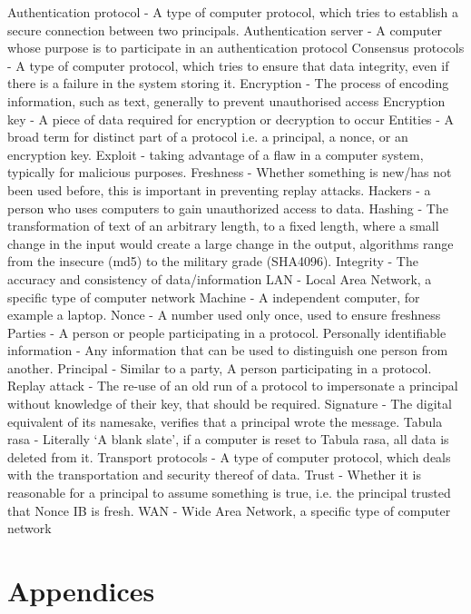 \documentclass{article}
\begin{document}
Authentication protocol - A type of computer protocol, which tries to establish a secure connection between two principals.
Authentication server - A computer whose purpose is to participate in an authentication protocol
Consensus protocols - A type of computer protocol, which tries to ensure that data integrity, even if there is a failure in the system storing it.
Encryption - The process of encoding information, such as text, generally to prevent unauthorised access
Encryption key - A piece of data required for encryption or decryption to occur
Entities - A broad term for distinct part of a protocol i.e. a principal, a nonce, or an encryption key.
Exploit - taking advantage of a flaw in a computer system, typically for malicious purposes.
Freshness - Whether something is new/has not been used before, this is important in preventing replay attacks.
Hackers - a person who uses computers to gain unauthorized access to data.
Hashing - The transformation of text of an arbitrary length, to a fixed length, where a small change in the input would create a large change in the output, algorithms range from the insecure (md5) to the military grade (SHA4096).
Integrity - The accuracy and consistency of data/information
LAN - Local Area Network, a specific type of computer network
Machine - A independent computer, for example a laptop.
Nonce - A number used only once, used to ensure freshness
Parties - A person or people participating in a protocol.
Personally identifiable information - Any information that can be used to distinguish one person from another.
Principal - Similar to a party, A person participating in a protocol.
Replay attack - The re-use of an old run of a protocol to impersonate a principal without knowledge of their key, that should be required.
Signature - The digital equivalent of its namesake, verifies that a principal wrote the message.
Tabula rasa - Literally ‘A blank slate’, if a computer is reset to Tabula rasa, all data is deleted from it.
Transport protocols - A type of computer protocol, which deals with the transportation and security thereof of data.
Trust - Whether it is reasonable for a principal to assume something is true, i.e. the principal trusted that Nonce IB is fresh.
WAN - Wide Area Network, a specific type of computer network        



\newpage
\section{Appendices}
\end{document}
